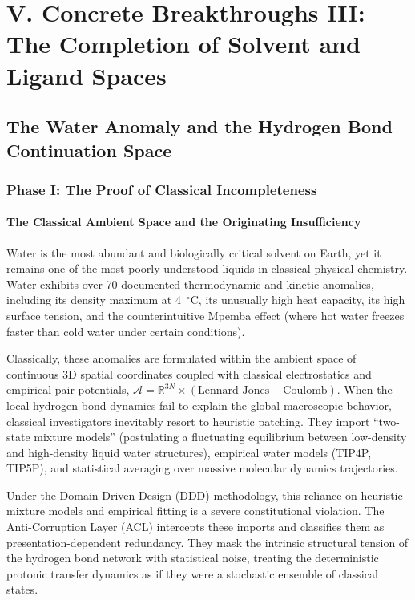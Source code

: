 \documentclass[11pt,openany]{extbook}
\theoremstyle{plain}
\theoremstyle{definition}
\begin{document}
\part{V. Concrete Breakthroughs III: The Completion of Solvent and Ligand Spaces}

\chapter{The Water Anomaly and the Hydrogen Bond Continuation Space}

\section{Phase I: The Proof of Classical Incompleteness}

\subsection{The Classical Ambient Space and the Originating Insufficiency}
Water is the most abundant and biologically critical solvent on Earth, yet it remains one of the most poorly understood liquids in classical physical chemistry. Water exhibits over 70 documented thermodynamic and kinetic anomalies, including its density maximum at 4~$^\circ$C, its unusually high heat capacity, its high surface tension, and the counterintuitive Mpemba effect (where hot water freezes faster than cold water under certain conditions).

Classically, these anomalies are formulated within the ambient space of continuous 3D spatial coordinates coupled with classical electrostatics and empirical pair potentials, $\mathcal{A} = \mathbb{R}^{3N} \times (\text{Lennard-Jones} + \text{Coulomb})$. When the local hydrogen bond dynamics fail to explain the global macroscopic behavior, classical investigators inevitably resort to heuristic patching. They import ``two-state mixture models'' (postulating a fluctuating equilibrium between low-density and high-density liquid water structures), empirical water models (TIP4P, TIP5P), and statistical averaging over massive molecular dynamics trajectories.

Under the Domain-Driven Design (DDD) methodology, this reliance on heuristic mixture models and empirical fitting is a severe constitutional violation. The Anti-Corruption Layer (ACL) intercepts these imports and classifies them as presentation-dependent redundancy. They mask the intrinsic structural tension of the hydrogen bond network with statistical noise, treating the deterministic protonic transfer dynamics as if they were a stochastic ensemble of classical states.
\end{document}

